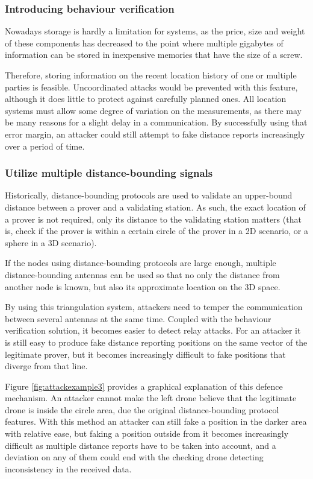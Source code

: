 \documentclass{article}
\begin{document}
\subsubsection{Introducing behaviour verification}

Nowadays storage is hardly a limitation for systems, as the price, size and weight of these components has decreased to the point where multiple gigabytes of information can be stored in inexpensive memories that have the size of a screw.

Therefore, storing information on the recent location history of one or multiple parties is feasible. Uncoordinated attacks would be prevented with this feature, although it does little to protect against carefully planned ones. All location systems must allow some degree of variation on the measurements, as there may be many reasons for a slight delay in a communication. By successfully using that error margin, an attacker could still attempt to fake distance reports increasingly over a period of time.



\subsubsection{Utilize multiple distance-bounding signals}

Historically, distance-bounding protocols are used to validate an upper-bound distance between a prover and a validating station. As such, the exact location of a prover is not required, only its distance to the validating station matters (that is, check if the prover is within a certain circle of the prover in a 2D scenario, or a sphere in a 3D scenario).

If the nodes using distance-bounding protocols are large enough, multiple distance-bounding antennas can be used so that no only the distance from another node is known, but also its approximate location on the 3D space.

By using this triangulation system, attackers need to temper the communication between several antennas at the same time. Coupled with the behaviour verification solution, it becomes easier to detect relay attacks. For an attacker it is still easy to produce fake distance reporting positions on the same vector of the legitimate prover, but it becomes increasingly difficult to fake positions that diverge from that line. 

Figure \ref{fig:attackexample3} provides a graphical explanation of this defence mechanism. An attacker cannot make the left drone believe that the legitimate drone is inside the circle area, due the original distance-bounding protocol features. With this method an attacker can still fake a position in the darker area with relative ease, but faking a position outside from it becomes increasingly difficult as multiple distance reports have to be taken into account, and a deviation on any of them could end with the checking drone detecting inconsistency in the received data.
\end{document}
